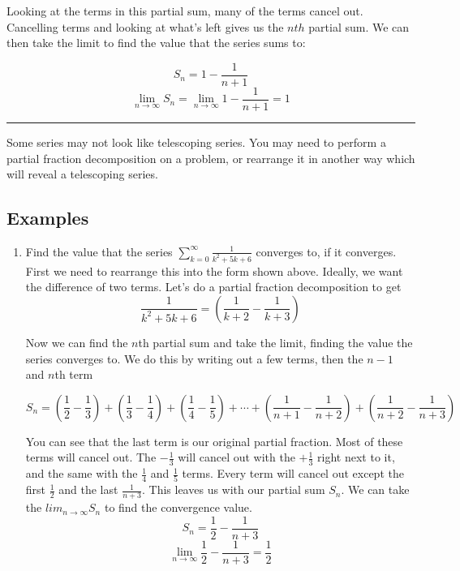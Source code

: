\documentclass[12pt]{report}
\begin{document}
Looking at the terms in this partial sum, many of the terms cancel out. Cancelling terms and looking at what's left gives us the $nth$ partial sum. We can then take the limit to find the value that the series sums to:

    $$ S_n = 1 - \frac{1}{n+1} $$
    $$ \lim_{n\to\infty} S_n = \lim_{n\to\infty} 1 - \frac{1}{n+1} = 1 $$

\noindent\rule{2cm}{0.4pt}


Some series may not look like telescoping series. You may need to perform a partial fraction decomposition on a problem, or rearrange it in another way which will reveal a telescoping series.

\subsection*{Examples}

\begin{enumerate}
	\item Find the value that the series $ \sum_{k=0}^{\infty} \frac{1}{k^2 + 5k + 6} $ converges to, if it converges. \\
	
	First we need to rearrange this into the form shown above. Ideally, we want the difference of two terms. Let's do a partial fraction decomposition to get
	$$
		\frac{1}{k^2 + 5k + 6} = \left( \frac{1}{k+2} - \frac{1}{k+3} \right)
	$$
	
	Now we can find the $n$th partial sum and take the limit, finding the value the series converges to. We do this by writing out a few terms, then the $n-1$ and $n$th term
	
	$$
		S_n = \left( \frac{1}{2} - \frac{1}{3} \right) + \left( \frac{1}{3} - \frac{1}{4} \right) + \left( \frac{1}{4} - \frac{1}{5} \right) +  \cdots + \left( \frac{1}{n+1} - \frac{1}{n+2} \right) + \left( \frac{1}{n+2} - \frac{1}{n+3} \right)
	$$
	
	You can see that the last term is our original partial fraction. Most of these terms will cancel out. The $-\frac{1}{3}$ will cancel out with the $+\frac{1}{3}$ right next to it, and the same with the $\frac{1}{4}$ and $\frac{1}{5}$ terms. Every term will cancel out except the first $\frac{1}{2}$ and the last $\frac{1}{n+3}$. This leaves us with our partial sum $S_n$. We can take the $lim_{n\to\infty} S_n$ to find the convergence value.
	$$ S_n = \frac{1}{2} - \frac{1}{n+3} $$
	$$ \lim_{n\to\infty} \frac{1}{2} - \frac{1}{n+3} = \frac{1}{2} $$
	
\end{enumerate}
\end{document}
